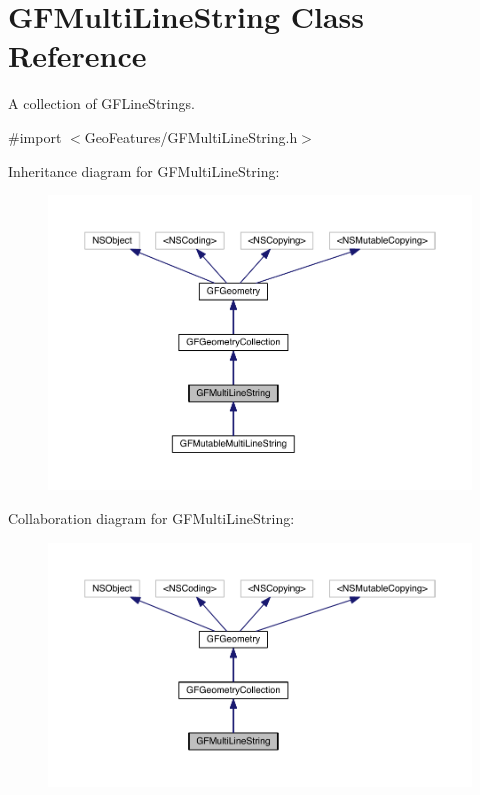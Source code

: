 \hypertarget{interface_g_f_multi_line_string}{}\section{G\+F\+Multi\+Line\+String Class Reference}
\label{interface_g_f_multi_line_string}


A collection of G\+F\+Line\+Strings.  




{\ttfamily \#import $<$Geo\+Features/\+G\+F\+Multi\+Line\+String.\+h$>$}



Inheritance diagram for G\+F\+Multi\+Line\+String\+:
\nopagebreak
\begin{figure}[H]
\begin{center}
\leavevmode
\includegraphics[width=350pt]{interface_g_f_multi_line_string__inherit__graph}
\end{center}
\end{figure}


Collaboration diagram for G\+F\+Multi\+Line\+String\+:
\nopagebreak
\begin{figure}[H]
\begin{center}
\leavevmode
\includegraphics[width=350pt]{interface_g_f_multi_line_string__coll__graph}
\end{center}
\end{figure}
